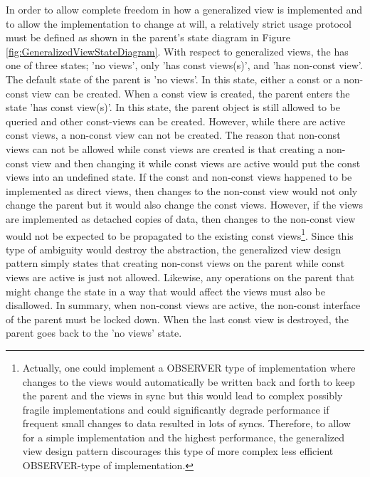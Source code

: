 \documentclass[pdf,ps2pdf,11pt]{SANDreport}
\begin{document}
In order to allow complete freedom in how a generalized view is
implemented and to allow the implementation to change at will, a
relatively strict usage protocol must be defined as shown in the
parent's state diagram in Figure
{}\ref{fig:GeneralizedViewStateDiagram}.  With respect to generalized
views, the {} has one of three states; 'no views', only
'has const views(s)', and 'has non-const view'.  The default state of
the parent is 'no views'.  In this state, either a const or a
non-const view can be created.  When a const view is created, the
parent enters the state 'has const view(s)'.  In this state, the
parent object is still allowed to be queried and other const-views can
be created.  However, while there are active const views, a non-const
view can not be created.  The reason that non-const views can not be
allowed while const views are created is that creating a non-const
view and then changing it while const views are active would put the
const views into an undefined state.  If the const and non-const views
happened to be implemented as direct views, then changes to the
non-const view would not only change the parent but it would also
change the const views.  However, if the views are implemented as
detached copies of data, then changes to the non-const view would not
be expected to be propagated to the existing const
views\footnote{Actually, one could implement a OBSERVER
{}\cite{AgileSoftwareDevelopment} type of implementation where changes
to the views would automatically be written back and forth to keep the
parent and the views in sync but this would lead to complex possibly
fragile implementations and could significantly degrade performance if
frequent small changes to data resulted in lots of syncs.  Therefore,
to allow for a simple implementation and the highest performance, the
generalized view design pattern discourages this type of more complex
less efficient OBSERVER-type of implementation.}.  Since this type of
ambiguity would destroy the abstraction, the generalized view design
pattern simply states that creating non-const views on the parent
while const views are active is just not allowed.  Likewise, any
operations on the parent that might change the state in a way that
would affect the views must also be disallowed.  In summary, when
non-const views are active, the non-const interface of the parent must
be locked down.  When the last const view is destroyed, the parent
goes back to the 'no views' state.
\end{document}
